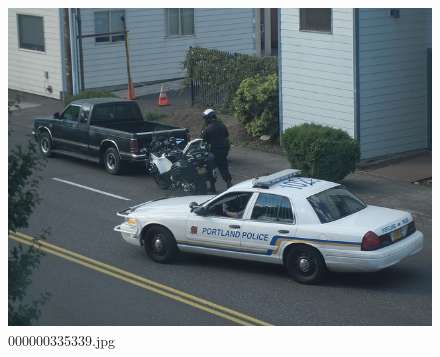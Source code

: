     \begin{figure}[h]
        \centering
        \includegraphics[width=0.8\linewidth]{../image set/easy/000000335339.jpg}
        \caption{000000335339.jpg}
    \end{figure} 
